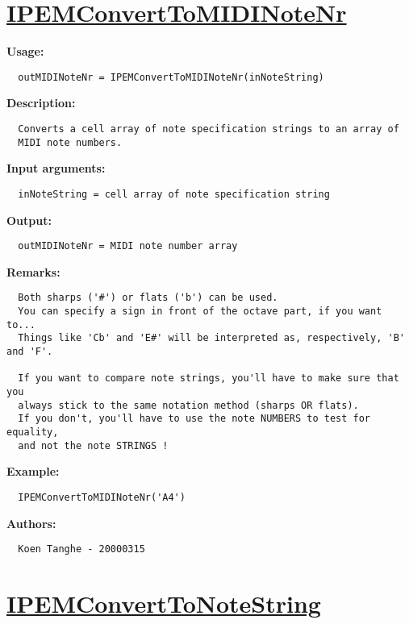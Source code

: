 \newpage
\section*{\hyperlink{Concepts:IPEMConvertToMIDINoteNr}{IPEMConvertToMIDINoteNr}}
\hypertarget{FuncRef:IPEMConvertToMIDINoteNr}{}

\textbf{Usage:}
\begin{verbatim}  outMIDINoteNr = IPEMConvertToMIDINoteNr(inNoteString)

\end{verbatim}
\textbf{Description:}
\begin{verbatim}  Converts a cell array of note specification strings to an array of
  MIDI note numbers.

\end{verbatim}
\textbf{Input arguments:}
\begin{verbatim}  inNoteString = cell array of note specification string

\end{verbatim}
\textbf{Output:}
\begin{verbatim}  outMIDINoteNr = MIDI note number array

\end{verbatim}
\textbf{Remarks:}
\begin{verbatim}  Both sharps ('#') or flats ('b') can be used.
  You can specify a sign in front of the octave part, if you want to...
  Things like 'Cb' and 'E#' will be interpreted as, respectively, 'B' and 'F'.

  If you want to compare note strings, you'll have to make sure that you
  always stick to the same notation method (sharps OR flats).
  If you don't, you'll have to use the note NUMBERS to test for equality,
  and not the note STRINGS !

\end{verbatim}
\textbf{Example:}
\begin{verbatim}  IPEMConvertToMIDINoteNr('A4')

\end{verbatim}
\textbf{Authors:}
\begin{verbatim}  Koen Tanghe - 20000315
\end{verbatim}


\newpage
\section*{\hyperlink{Concepts:IPEMConvertToNoteString}{IPEMConvertToNoteString}}
\hypertarget{FuncRef:IPEMConvertToNoteString}{}

